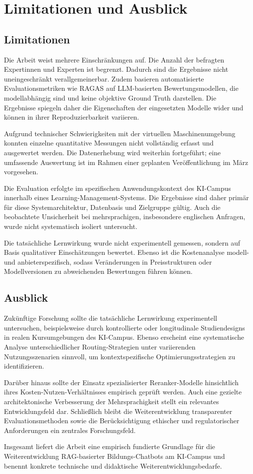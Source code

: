 \chapter{Limitationen und Ausblick}
\label{sec:limitationen}

\section{Limitationen}

Die Arbeit weist mehrere Einschränkungen auf. Die Anzahl der befragten Expertinnen und Experten ist begrenzt. Dadurch sind die Ergebnisse nicht uneingeschränkt verallgemeinerbar. Zudem basieren automatisierte Evaluationsmetriken wie RAGAS auf LLM-basierten Bewertungsmodellen, die modellabhängig sind und keine objektive Ground Truth darstellen. Die Ergebnisse spiegeln daher die Eigenschaften der eingesetzten Modelle wider und können in ihrer Reproduzierbarkeit variieren.

Aufgrund technischer Schwierigkeiten mit der virtuellen Maschinenumgebung konnten einzelne quantitative Messungen nicht vollständig erfasst und ausgewertet werden. Die Datenerhebung wird weiterhin fortgeführt; eine umfassende Auswertung ist im Rahmen einer geplanten Veröffentlichung im März vorgesehen.

Die Evaluation erfolgte im spezifischen Anwendungskontext des KI-Campus innerhalb eines Learning-Management-Systems. Die Ergebnisse sind daher primär für diese Systemarchitektur, Datenbasis und Zielgruppe gültig. Auch die beobachtete Unsicherheit bei mehrsprachigen, insbesondere englischen Anfragen, wurde nicht systematisch isoliert untersucht.

Die tatsächliche Lernwirkung wurde nicht experimentell gemessen, sondern auf Basis qualitativer Einschätzungen bewertet. Ebenso ist die Kostenanalyse modell- und anbieterspezifisch, sodass Veränderungen in Preisstrukturen oder Modellversionen zu abweichenden Bewertungen führen können.

\section{Ausblick}

Zukünftige Forschung sollte die tatsächliche Lernwirkung experimentell untersuchen, beispielsweise durch kontrollierte oder longitudinale Studiendesigns in realen Kursumgebungen des KI-Campus. Ebenso erscheint eine systematische Analyse unterschiedlicher Routing-Strategien unter variierenden Nutzungsszenarien sinnvoll, um kontextspezifische Optimierungsstrategien zu identifizieren.

Darüber hinaus sollte der Einsatz spezialisierter Reranker-Modelle hinsichtlich ihres Kosten-Nutzen-Verhältnisses empirisch geprüft werden. Auch eine gezielte architektonische Verbesserung der Mehrsprachigkeit stellt ein relevantes Entwicklungsfeld dar. Schließlich bleibt die Weiterentwicklung transparenter Evaluationsmethoden sowie die Berücksichtigung ethischer und regulatorischer Anforderungen ein zentrales Forschungsfeld.

Insgesamt liefert die Arbeit eine empirisch fundierte Grundlage für die Weiterentwicklung RAG-basierter Bildungs-Chatbots am KI-Campus und benennt konkrete technische und didaktische Weiterentwicklungsbedarfe.